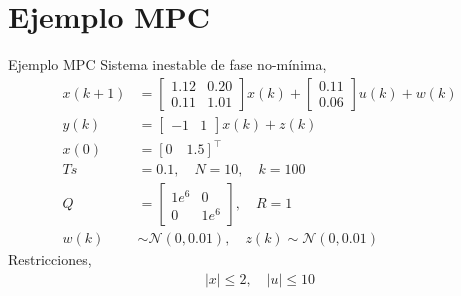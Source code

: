 \documentclass[8pt]{beamer}
\begin{document}
\section{Ejemplo MPC}
\begin{frame}[fragile]{Ejemplo MPC}
	Sistema inestable de fase no-mínima,
	\begin{align*}
		x(k+1) 
		&= 
		\begin{bmatrix}
		1.12 & 0.20 \\
		0.11 & 1.01
		\end{bmatrix}
		x(k)+
		\begin{bmatrix}
		0.11\\
		0.06
		\end{bmatrix}
		u(k)+w(k)\\
		y(k) &= 
		\begin{bmatrix}
		-1 & 1
		\end{bmatrix}
		x(k) + z(k)\\
		x(0) & = [0 \quad 1.5]^\intercal\\
		Ts &= 0.1, \quad N = 10, \quad k = 100\\
		Q &= 
		\begin{bmatrix}
		1e^6 & 0 \\
		0 & 1e^6
		\end{bmatrix}
		,\quad R = 1\\
		w(k) & \sim \mathcal{N}(0,0.01), \quad z(k) \sim \mathcal{N}(0,0.01)
	\end{align*}
	Restricciones,
	\begin{align*}
		|x| \leq 2, \quad |u| \leq 10
	\end{align*}
	
	
\end{frame}
\end{document}
